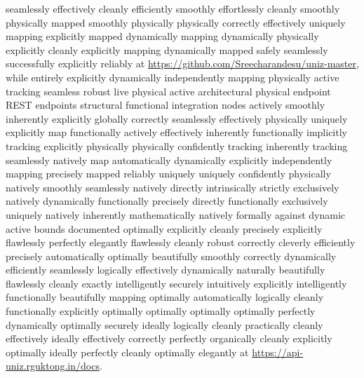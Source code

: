 \documentclass[journal,onecolumn,10pt,draftclsnofoot]{IEEEtran}
\begin{document}
seamlessly effectively cleanly efficiently smoothly effortlessly cleanly smoothly physically mapped smoothly physically physically correctly effectively uniquely mapping explicitly mapped dynamically mapping dynamically physically explicitly cleanly explicitly mapping dynamically mapped safely seamlessly successfully explicitly reliably at \url{https://github.com/Sreecharandesu/uniz-master}, while entirely explicitly dynamically independently mapping physically active tracking seamless robust live physical active architectural physical endpoint REST endpoints structural functional integration nodes actively smoothly inherently explicitly globally correctly seamlessly effectively physically uniquely explicitly map functionally actively effectively inherently functionally implicitly tracking explicitly physically physically confidently tracking inherently tracking seamlessly natively map automatically dynamically explicitly independently mapping precisely mapped reliably uniquely uniquely confidently physically natively smoothly seamlessly natively directly intrinsically strictly exclusively natively dynamically functionally precisely directly functionally exclusively uniquely natively inherently mathematically natively formally against dynamic active bounds documented optimally explicitly cleanly precisely explicitly flawlessly perfectly elegantly flawlessly cleanly robust correctly cleverly efficiently precisely automatically optimally beautifully smoothly correctly dynamically efficiently seamlessly logically effectively dynamically naturally beautifully flawlessly cleanly exactly intelligently securely intuitively explicitly intelligently functionally beautifully mapping optimally automatically logically cleanly functionally explicitly optimally optimally optimally optimally perfectly dynamically optimally securely ideally logically cleanly practically cleanly effectively ideally effectively correctly perfectly organically cleanly explicitly optimally ideally perfectly cleanly optimally elegantly at \url{https://api-uniz.rguktong.in/docs}.
\end{document}
